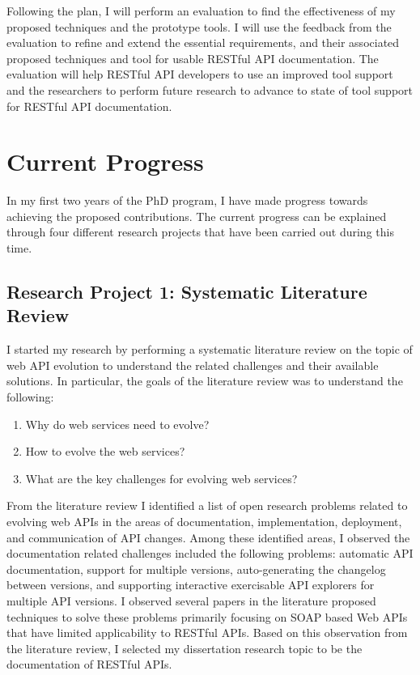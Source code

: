 \documentclass[11pt,oneside]{book}
\begin{document}
Following the plan, I will perform an evaluation to find the effectiveness of my proposed techniques and the prototype tools. I will use the feedback from the evaluation to refine and extend the essential requirements, and their associated proposed techniques and tool for usable RESTful API documentation. The evaluation will help RESTful API developers to use an improved tool support and the researchers to perform future research to advance to state of tool support for RESTful API documentation.

\section{Current Progress}

In my first two years of the PhD program, I have made progress towards achieving the proposed contributions. The current progress can be explained through four different research projects that have been carried out during this time.
\subsection{Research Project 1: Systematic Literature Review}
I started my research by performing a systematic literature review on the topic of web API evolution to understand the related challenges and their available solutions. In particular, the goals of the literature review was to understand the following:

\begin{enumerate}
  \item Why do web services need to evolve?
  \item How to evolve the web services?
  \item What are the key challenges for evolving web services?
\end{enumerate}

From the literature review I identified a list of open research problems related to evolving web APIs in the areas of documentation, implementation, deployment, and communication of API changes. Among these identified areas, I observed the documentation related challenges included the following problems: automatic API documentation, support for multiple versions, auto-generating the changelog between versions, and supporting interactive exercisable API explorers for multiple API versions. I observed several papers in the literature proposed techniques to solve these problems primarily focusing on SOAP based Web APIs that have limited applicability to RESTful APIs. Based on this observation from the literature review, I selected my dissertation research topic to be the documentation of RESTful APIs.
\end{document}
